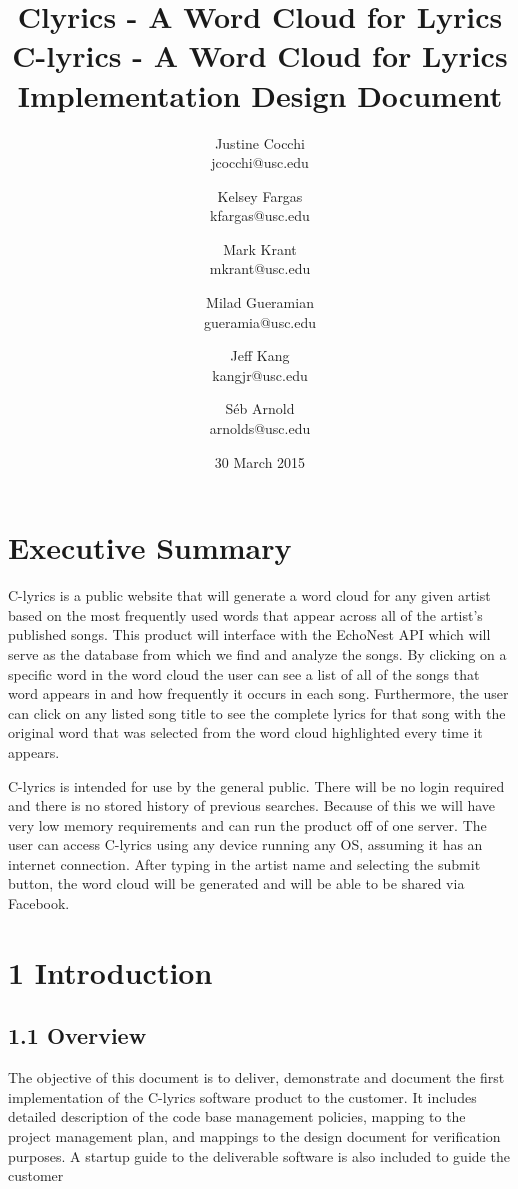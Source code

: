 \documentclass[]{article}
\title{Clyrics - A Word Cloud for Lyrics}
\author{Justine Cocchi\\jcocchi@usc.edu \and Kelsey Fargas\\kfargas@usc.edu \and Mark Krant \\ mkrant@usc.edu\and Milad Gueramian\\gueramia@usc.edu \and Jeff Kang\\kangjr@usc.edu \and Séb Arnold\\arnolds@usc.edu}
\date{30 March 2015}
\title{%
	C-lyrics - A Word Cloud for Lyrics \\
	\large Implementation Design Document}
\begin{document}
\clearpage\maketitle
\thispagestyle{empty}

\pagebreak

\tableofcontents
\setcounter{tocdepth}{3}
\thispagestyle{empty}

\pagebreak

\section{Executive Summary}\label{executive-summary}

C-lyrics is a public website that will generate a word cloud for any
given artist based on the most frequently used words that appear across
all of the artist's published songs. This product will interface with
the EchoNest API which will serve as the database from which we find and
analyze the songs. By clicking on a specific word in the word cloud the
user can see a list of all of the songs that word appears in and how
frequently it occurs in each song. Furthermore, the user can click on
any listed song title to see the complete lyrics for that song with the
original word that was selected from the word cloud highlighted every
time it appears.

C-lyrics is intended for use by the general public. There will be no
login required and there is no stored history of previous searches.
Because of this we will have very low memory requirements and can run
the product off of one server. The user can access C-lyrics using any
device running any OS, assuming it has an internet connection. After
typing in the artist name and selecting the submit button, the word
cloud will be generated and will be able to be shared via Facebook.

\pagebreak

\section{1 Introduction}\label{introduction}

\subsection{\textbf{1.1 Overview}}\label{overview}

The objective of this document is to deliver, demonstrate and document
the first implementation of the C-lyrics software product to the
customer. It includes detailed description of the code base management
policies, mapping to the project management plan, and mappings to the
design document for verification purposes. A startup guide to the
deliverable software is also included to guide the customer
\end{document}

